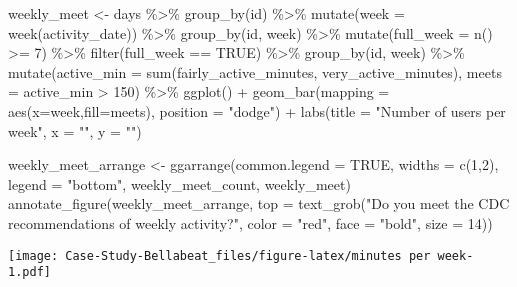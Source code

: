 \documentclass[
]{article}
\newenvironment{Shaded}{\begin{snugshade}}{\end{snugshade}}
\newcommand{\AttributeTok}[1]{\textcolor[rgb]{0.77,0.63,0.00}{#1}}
\newcommand{\ConstantTok}[1]{\textcolor[rgb]{0.00,0.00,0.00}{#1}}
\newcommand{\DecValTok}[1]{\textcolor[rgb]{0.00,0.00,0.81}{#1}}
\newcommand{\FunctionTok}[1]{\textcolor[rgb]{0.00,0.00,0.00}{#1}}
\newcommand{\NormalTok}[1]{#1}
\newcommand{\OtherTok}[1]{\textcolor[rgb]{0.56,0.35,0.01}{#1}}
\newcommand{\SpecialCharTok}[1]{\textcolor[rgb]{0.00,0.00,0.00}{#1}}
\newcommand{\StringTok}[1]{\textcolor[rgb]{0.31,0.60,0.02}{#1}}
\begin{document}
\begin{Shaded}
\begin{Highlighting}[]
\NormalTok{weekly\_meet }\OtherTok{\textless{}{-}}\NormalTok{ days }\SpecialCharTok{\%\textgreater{}\%}
  \FunctionTok{group\_by}\NormalTok{(id) }\SpecialCharTok{\%\textgreater{}\%}
  \FunctionTok{mutate}\NormalTok{(}\AttributeTok{week =} \FunctionTok{week}\NormalTok{(activity\_date)) }\SpecialCharTok{\%\textgreater{}\%}
  \FunctionTok{group\_by}\NormalTok{(id, week) }\SpecialCharTok{\%\textgreater{}\%}
  \FunctionTok{mutate}\NormalTok{(}\AttributeTok{full\_week =} \FunctionTok{n}\NormalTok{() }\SpecialCharTok{\textgreater{}=} \DecValTok{7}\NormalTok{) }\SpecialCharTok{\%\textgreater{}\%}
  \FunctionTok{filter}\NormalTok{(full\_week }\SpecialCharTok{==} \ConstantTok{TRUE}\NormalTok{) }\SpecialCharTok{\%\textgreater{}\%}
  \FunctionTok{group\_by}\NormalTok{(id, week) }\SpecialCharTok{\%\textgreater{}\%}
  \FunctionTok{mutate}\NormalTok{(}\AttributeTok{active\_min =} \FunctionTok{sum}\NormalTok{(fairly\_active\_minutes, very\_active\_minutes),}
            \AttributeTok{meets =}\NormalTok{ active\_min }\SpecialCharTok{\textgreater{}} \DecValTok{150}\NormalTok{) }\SpecialCharTok{\%\textgreater{}\%}
  \FunctionTok{ggplot}\NormalTok{() }\SpecialCharTok{+} 
  \FunctionTok{geom\_bar}\NormalTok{(}\AttributeTok{mapping =} \FunctionTok{aes}\NormalTok{(}\AttributeTok{x=}\NormalTok{week,}\AttributeTok{fill=}\NormalTok{meets), }\AttributeTok{position =} \StringTok{"dodge"}\NormalTok{) }\SpecialCharTok{+}
  \FunctionTok{labs}\NormalTok{(}\AttributeTok{title =} \StringTok{"Number of users per week"}\NormalTok{, }\AttributeTok{x =} \StringTok{""}\NormalTok{, }\AttributeTok{y =} \StringTok{""}\NormalTok{)}



\NormalTok{weekly\_meet\_arrange }\OtherTok{\textless{}{-}} \FunctionTok{ggarrange}\NormalTok{(}\AttributeTok{common.legend =} \ConstantTok{TRUE}\NormalTok{, }\AttributeTok{widths =} \FunctionTok{c}\NormalTok{(}\DecValTok{1}\NormalTok{,}\DecValTok{2}\NormalTok{), }\AttributeTok{legend =} \StringTok{"bottom"}\NormalTok{, weekly\_meet\_count, weekly\_meet)}
\FunctionTok{annotate\_figure}\NormalTok{(weekly\_meet\_arrange, }\AttributeTok{top =} \FunctionTok{text\_grob}\NormalTok{(}\StringTok{"Do you meet the CDC recommendations of weekly activity?"}\NormalTok{, }
               \AttributeTok{color =} \StringTok{"red"}\NormalTok{, }\AttributeTok{face =} \StringTok{"bold"}\NormalTok{, }\AttributeTok{size =} \DecValTok{14}\NormalTok{))}
\end{Highlighting}
\end{Shaded}

\texttt{[image: Case-Study-Bellabeat\_files/figure-latex/minutes per week-1.pdf]}
\end{document}
